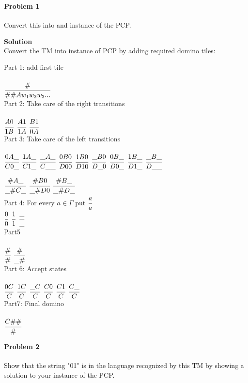 \documentclass{article}
\newcommand{\domino}[2]{\cfrac{#1}{#2}}
\newcommand{\problem}[1]{\large{\textbf{Problem #1}}\\}
\begin{document}
\problem{1} \\
Convert this into and instance of the PCP.

\textbf{Solution} \\
Convert the TM into instance of PCP by adding required domino tiles:

Part 1: add first tile\\ \\
$\domino{\#}{\#\#Aw_1w_2w_3...}$ \\

Part 2: Take care of the right transitions\\ \\
$\domino{A0}{1B}$ 
$\domino{A1}{1A}$ 
$\domino{B1}{0A}$  \\

Part 3: Take care of the left transitions\\ \\ 
$\domino{0A\_}{C0\_}$
$\domino{1A\_}{C1\_}$
$\domino{\_A\_}{C\_\_}$
$\domino{0B0}{D00}$
$\domino{1B0}{D10}$
$\domino{\_B0}{D\_0}$ 
$\domino{0B\_}{D0\_}$
$\domino{1B\_}{D1\_}$
$\domino{\_B\_}{D\_\_}$

$\domino{\#A\_}{\_\#C\_}$ 
$\domino{\#B0}{\_\#D0}$ 
$\domino{\#B\_}{\_\#D\_}$\\

Part 4: For every $a \in \Gamma$ put $\domino{a}{a}$\\
$\domino{0}{0}$ 
$\domino{1}{1}$ 
$\domino{\_}{\_}$ \\

Part5\\ \\
$\domino{\#}{\#}$
$\domino{\#}{\_\#}$ \\


Part 6: Accept states\\ \\
$\domino{0C}{C}$ 
$\domino{1C}{C}$ 
$\domino{\_C}{C}$
$\domino{C0}{C}$ 
$\domino{C1}{C}$ 
$\domino{C\_}{C}$ \\

Part7: Final domino\\ \\
$\domino{C\#\#}{\#}$ \\

\pagebreak

\problem{2} \\
Show that the string "01" is in the language recognized by this TM by showing a solution to your instance of the PCP.
\end{document}
